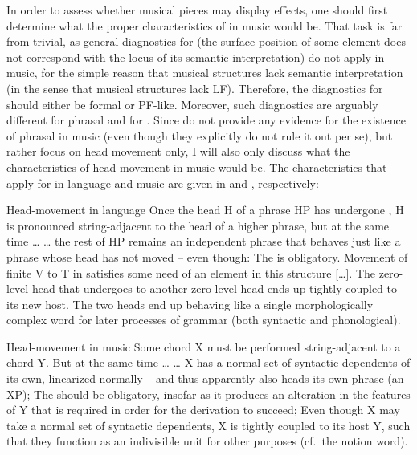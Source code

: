 \documentclass[output=paper]{langsci/langscibook}
\begin{document}
In order to assess whether musical pieces may display  effects, one
should first determine what the proper characteristics of  in music
would be. That task is far from trivial, as general diagnostics for 
(the surface position of some element does not correspond with the locus of its
semantic interpretation) do not apply in music, for the simple reason that
musical structures lack semantic interpretation (in the sense that musical
structures lack \gls{LF}). Therefore, the diagnostics for  should
either be formal or PF-like. Moreover, such diagnostics are arguably different
for phrasal  and for . Since \citeauthor{KatzPes2011} do
not provide any evidence for the existence of phrasal  in music (even
though they explicitly do not rule it out per se), but rather focus on head
movement only, I will also only discuss what the characteristics of head
movement in music would be. The characteristics that \citeauthor{KatzPes2011}
apply for  in language and music are given in 
and , respectively:

\ea\label{ex:key:26.10}Head-movement in language \parencite[40]{KatzPes2011}
    \ea Once the head H of a phrase HP has undergone , H is
    pronounced string-adjacent to the head of a higher phrase, but at the same
    time \dots{}
    \ex \dots{} the rest of HP remains an independent phrase that behaves just
    like a phrase whose head has not moved -- even though:
    \ex The  is obligatory. Movement of finite V to T in 
    satisfies some need of an element in this structure [\dots{}].
    \ex The zero-level head that undergoes  to another zero-level
    head ends up tightly coupled to its new host. The two heads end up behaving
    like a single morphologically complex word for later processes of grammar
    (both syntactic and phonological).
    \z
\z

\ea\label{ex:key:26.11}Head-movement in music \parencite[41]{KatzPes2011}
    \ea Some chord X must be performed string-adjacent to a chord Y. But at the
    same time \dots{}
    \ex \dots{} X has a normal set of syntactic dependents of its own,
    linearized normally -- and thus apparently also heads its own phrase (an
    XP);
    \ex The  should be obligatory, insofar as it produces an alteration
    in the features of Y that is required in order for the derivation to
    succeed;
    \ex Even though X may take a normal set of syntactic dependents, X is
    tightly coupled to its host Y, such that they function as an indivisible
    unit for other purposes (cf.\ the notion word).
    \z
\z
\end{document}
